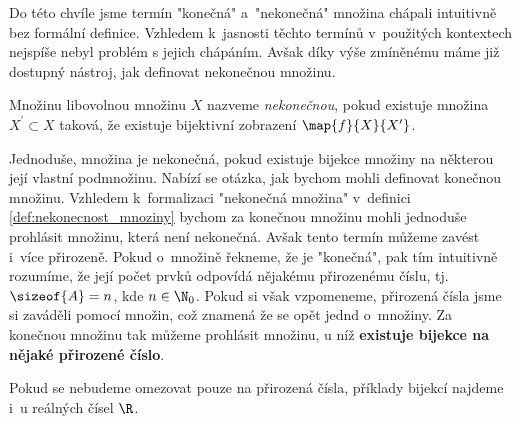 Do této chvíle jsme termín "konečná" a~"nekonečná" množina chápali intuitivně bez formální definice. Vzhledem k~jasnosti těchto termínů v~použitých kontextech nejspíše nebyl problém s jejich chápáním. Avšak díky výše zmíněnému máme již dostupný nástroj, jak definovat nekonečnou množinu.
\begin{definition}\label{def:nekonecnost_mnoziny}
    Množinu libovolnou množinu $X$ nazveme \emph{nekonečnou}, pokud existuje množina $X^\prime\subset X$ taková, že existuje bijektivní zobrazení $\map{f}{X}{X^\prime}$. 
\end{definition}
Jednoduše, množina je nekonečná, pokud existuje bijekce množiny na některou její vlastní podmnožinu. Nabízí se otázka, jak bychom mohli definovat konečnou množinu. Vzhledem k~formalizaci "nekonečná množina" v~definici \ref{def:nekonecnost_mnoziny} bychom za konečnou množinu mohli jednoduše prohlásit množinu, která není nekonečná. Avšak tento termín můžeme zavést i~více přirozeně. Pokud o~množině řekneme, že je "konečná", pak tím intuitivně rozumíme, že její počet prvků odpovídá nějakému přirozenému číslu, tj. $\sizeof{A}=n$, kde $n\in\N_0$. Pokud si však vzpomeneme, přirozená čísla jsme si zaváděli pomocí množin, což znamená že se opět jednd o~množiny. Za konečnou množinu tak můžeme prohlásit množinu, u níž \textbf{existuje bijekce na nějaké přirozené číslo}.\par
Pokud se nebudeme omezovat pouze na přirozená čísla, příklady bijekcí najdeme i~u reálných čísel $\R$.
